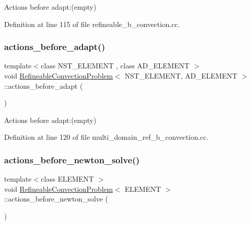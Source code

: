 Actions before adapt\+:(empty) 



Definition at line 115 of file refineable\+\_\+b\+\_\+convection.\+cc.

\mbox{\label{classRefineableConvectionProblem_a962499683ada1233e20055e46b15fdb0}} 
\subsubsection{\texorpdfstring{actions\+\_\+before\+\_\+adapt()}{actions\_before\_adapt()}\hspace{0.1cm}{\footnotesize\ttfamily [2/2]}}
{\footnotesize\ttfamily template$<$class N\+S\+T\+\_\+\+E\+L\+E\+M\+E\+NT , class A\+D\+\_\+\+E\+L\+E\+M\+E\+NT $>$ \\
void \hyperlink{classRefineableConvectionProblem}{Refineable\+Convection\+Problem}$<$ N\+S\+T\+\_\+\+E\+L\+E\+M\+E\+NT, A\+D\+\_\+\+E\+L\+E\+M\+E\+NT $>$\+::actions\+\_\+before\+\_\+adapt (\begin{DoxyParamCaption}{ }\end{DoxyParamCaption})\hspace{0.3cm}{\ttfamily [inline]}}



Actions before adapt\+:(empty) 



Definition at line 120 of file multi\+\_\+domain\+\_\+ref\+\_\+b\+\_\+convection.\+cc.

\mbox{\label{classRefineableConvectionProblem_a694f0be87fe09a30d94e92acfce85eee}} 
\subsubsection{\texorpdfstring{actions\+\_\+before\+\_\+newton\+\_\+solve()}{actions\_before\_newton\_solve()}\hspace{0.1cm}{\footnotesize\ttfamily [1/2]}}
{\footnotesize\ttfamily template$<$class E\+L\+E\+M\+E\+NT $>$ \\
void \hyperlink{classRefineableConvectionProblem}{Refineable\+Convection\+Problem}$<$ E\+L\+E\+M\+E\+NT $>$\+::actions\+\_\+before\+\_\+newton\+\_\+solve (\begin{DoxyParamCaption}{ }\end{DoxyParamCaption})}



